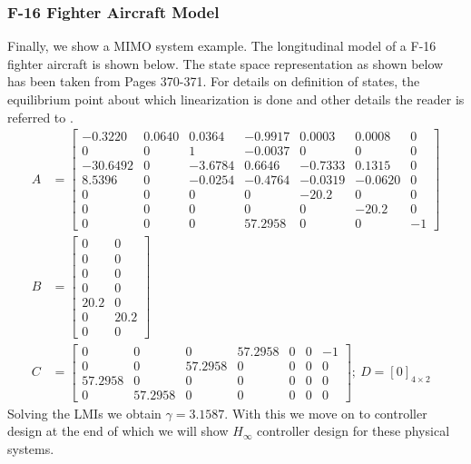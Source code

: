 \documentclass[a4paper,12pt]{article}
\begin{document}
     \subsubsection{F-16 Fighter Aircraft Model} 
     Finally, we show a MIMO system example. The longitudinal model of a F-16 fighter aircraft is shown below. The state space representation as shown below has been taken from \cite{aircraft} Pages 370-371. For details on definition of states, the equilibrium point about which linearization is done and other details the reader is referred to \cite{aircraft}.
     \begin{align}
     A &= \begin{bmatrix}
-0.3220 & 0.0640 & 0.0364 & -0.9917 & 0.0003 & 0.0008 & 0\\
0 &0 &1 &-0.0037 &0 &0 &0\\
-30.6492 &0 &-3.6784 &0.6646 &-0.7333 &0.1315 &0\\
8.5396 &0 &-0.0254 &-0.4764 &-0.0319 &-0.0620 &0\\
0 &0 &0 &0 &-20.2 &0 &0\\
0 &0 &0 &0 &0 &-20.2 &0\\
0 &0 &0 &57.2958 &0 &0 &-1 \end{bmatrix}\\
B &= \begin{bmatrix}
0& 0 \\
0& 0\\
0& 0\\
0& 0\\
20.2 &0\\
0 &20.2\\
0 &0 \end{bmatrix}\\
C &= \begin{bmatrix}
0 &0 &0 &57.2958 &0 &0 &-1\\
0 &0 &57.2958 &0 &0 &0 &0\\
57.2958 &0 &0 &0 &0 &0 &0\\
0& 57.2958 &0 &0 &0 &0 &0 \end{bmatrix};\: D=[0]_{4 \times 2}
     \end{align}
Solving the LMIs we obtain $\gamma=3.1587$. With this we move on to controller design at the end of which we will show $H_{\infty}$ controller design for these physical systems.      
\end{document}
